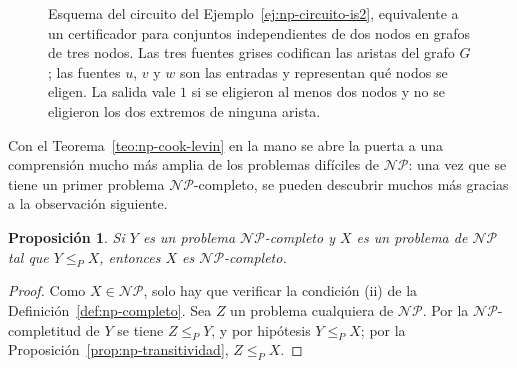 \documentclass[12pt, spanish, oneside, openany]{book}
\newcommand{\NP}{\mathcal{NP}}
\newcommand{\redp}{\le_{P}}
\theoremstyle{uprightplain}
\newtheorem{proposicion}[teorema]{Proposición}
\theoremstyle{definition}
\theoremstyle{remark}
\theoremstyle{definition}
\begin{document}
\begin{figure}[H]
\centering
{}
\caption{Esquema del circuito del Ejemplo~\ref{ej:np-circuito-is2}, equivalente
a un certificador para conjuntos independientes de dos nodos en grafos de tres
nodos. Las tres fuentes grises codifican las aristas del grafo $G$; las fuentes
$u$, $v$ y $w$ son las entradas y representan qué nodos se eligen. La salida
vale $1$ si se eligieron al menos dos nodos y no se eligieron los dos extremos
de ninguna arista.}
\label{fig:np-circuito-is2}
\end{figure}

Con el Teorema~\ref{teo:np-cook-levin} en la mano se abre la puerta a una comprensión mucho más amplia de los problemas difíciles de $\NP$: una vez que se tiene un primer problema $\NP$-completo, se pueden descubrir muchos más gracias a la observación siguiente.

\begin{proposicion}
\label{prop:np-completo-transitivo}
Si $Y$ es un problema $\NP$-completo y $X$ es un problema de $\NP$ tal que $Y\redp X$, entonces $X$ es $\NP$-completo.
\end{proposicion}
\begin{proof}
Como $X\in\NP$, solo hay que verificar la condición (ii) de la Definición~\ref{def:np-completo}. Sea $Z$ un problema cualquiera de $\NP$. Por la $\NP$-completitud de $Y$ se tiene $Z\redp Y$, y por hipótesis $Y\redp X$; por la Proposición~\ref{prop:np-transitividad}, $Z\redp X$.
\end{proof}
\end{document}
